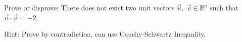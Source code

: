 
\begin{Exercise}[
name={},
title={}, 
difficulty=0,
origin={\cite{YL}}]
Prove or disprove: There does not exist two unit vectors $\vec{u},\;\vec{v}\in\mathbb{R}^n$ such that $\vec{u}\cdot\vec{v}=-2$.
\end{Exercise}

\begin{Answer}
Hint: Prove by contradiction, can use Cauchy-Schwartz Inequality.
\end{Answer}
